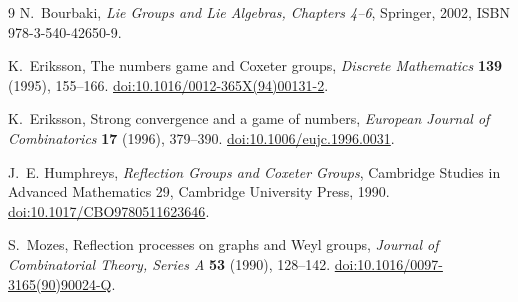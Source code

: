 \documentclass[10pt]{article}
\begin{document}
\begin{thebibliography}{9}
N.~Bourbaki,
\emph{Lie Groups and Lie Algebras, Chapters 4--6},
Springer, 2002, ISBN 978-3-540-42650-9.

K.~Eriksson,
The numbers game and Coxeter groups,
\emph{Discrete Mathematics} \textbf{139} (1995), 155--166.
\href{https://doi.org/10.1016/0012-365X(94)00131-2}
{doi:10.1016/0012-365X(94)00131-2}.

K.~Eriksson,
Strong convergence and a game of numbers,
\emph{European Journal of Combinatorics} \textbf{17} (1996), 379--390.
\href{https://doi.org/10.1006/eujc.1996.0031}
{doi:10.1006/eujc.1996.0031}.

J.~E. Humphreys,
\emph{Reflection Groups and Coxeter Groups},
Cambridge Studies in Advanced Mathematics 29, Cambridge University Press,
1990.
\href{https://doi.org/10.1017/CBO9780511623646}
{doi:10.1017/CBO9780511623646}.

S.~Mozes,
Reflection processes on graphs and Weyl groups,
\emph{Journal of Combinatorial Theory, Series A} \textbf{53} (1990),
128--142.
\href{https://doi.org/10.1016/0097-3165(90)90024-Q}
{doi:10.1016/0097-3165(90)90024-Q}.
\end{thebibliography}
\end{document}
